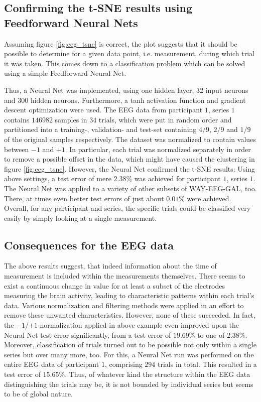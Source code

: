 \documentclass{article} %
\begin{document}
\subsection{Confirming the t-SNE results using Feedforward Neural Nets}
Assuming figure \ref{fig:eeg_tsne} is correct, the plot suggests that it should be possible to determine for a given data point, i.e. measurement, during which trial it was taken. This comes down to a classification problem which can be solved using a simple Feedforward Neural Net.

Thus, a Neural Net was implemented, using one hidden layer, $32$ input neurons and $300$ hidden neurons. Furthermore, a tanh activation function and gradient descent optimization were used. The EEG data from participant $1$, series $1$ contains $146982$ samples in $34$ trials, which were put in random order and partitioned into a training-, validation- and test-set containing $4/9$, $2/9$ and $1/9$ of the original samples respectively. The dataset was normalized to contain values between $-1$ and $+1$. In particular, each trial was normalized separately in order to remove a possible offset in the data, which might have caused the clustering in figure \ref{fig:eeg_tsne}.
However, the Neural Net confirmed the t-SNE results: Using above settings, a test error of mere $2.38\%$ was achieved for participant $1$, series $1$. The Neural Net was applied to a variety of other subsets of WAY-EEG-GAL, too. There, at times even better test errors of just about $0.01\%$ were achieved. Overall, for any participant and series, the specific trials could be classified very easily by simply looking at a single measurement.

\subsection{Consequences for the EEG data}
The above results suggest, that indeed information about the time of measurement is included within the measurements themselves. There seems to exist a continuous change in value for at least a subset of the electrodes measuring the brain activity, leading to characteristic patterns within each trial's data. Various normalization and filtering methods were applied in an effort to remove these unwanted characteristics. However, none of these succeeded. In fact, the $-1$/$+1$-normalization applied in above example even improved upon the Neural Net test error significantly, from a test error of $19.69\%$ to one of $2.38\%$.
Moreover, classification of trials turned out to be possible not only within a single series but over many more, too. For this, a Neural Net run was performed on the entire EEG data of participant $1$, comprising $294$ trials in total. This resulted in a test error of $15.65\%$.
Thus, of whatever kind the structure within the EEG data distinguishing the trials may be, it is not bounded by individual series but seems to be of global nature.
\end{document}
